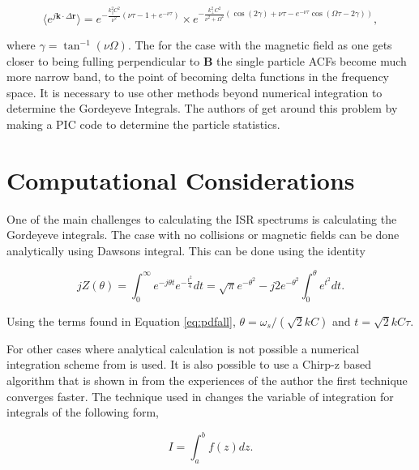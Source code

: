 \documentclass[10pt]{report}
\begin{document}
\begin{equation}
\label{eq:colspacf}
\langle e^{j\mathbf{k}\cdot\Delta \mathbf{r}}\rangle = e^{-\frac{k_\parallel^2C^2}{\nu^2}\left( \nu \tau-1+e^{-\nu\tau}\right)}\times e^{-\frac{k_\perp^2C^2}{\nu^2+\Omega^2}\left(\cos(2\gamma) + \nu \tau-e^{-\nu\tau}\cos(\Omega\tau-2\gamma)\right)},
\end{equation}
 
\noindent where $\gamma = \tan^{-1}(\nu\Omega)$. The for the case with the magnetic field as one gets closer to being fulling perpendicular to $\mathbf{B}$ the single particle ACFs become much more narrow band, to the point of becoming delta functions in the frequency space. It is necessary to use other methods beyond numerical integration to determine the Gordeyeve Integrals. The authors of \cite{kudeki:milla:2} get around this problem by making a PIC code to determine the particle statistics. 


 \section*{Computational Considerations}
One of the main challenges to calculating the ISR spectrums is calculating the Gordeyeve integrals. The case with no collisions or magnetic fields can be done analytically using Dawsons integral. This can be done using the identity

\begin{equation}
\label{eq:daw1}
jZ(\theta) = \int_0^{\infty} e^{-j\theta t}e^{-\frac{t^2}{4}}dt = \sqrt{\pi}e^{-\theta^2}-j2e^{-\theta^2}\int_0^\theta e^{t^2}dt.
\end{equation}

\noindent Using the terms found in Equation \ref{eq:pdfall}, $\theta=\omega_s/\left(\sqrt{2}kC\right)$ and $t=\sqrt{2}kC\tau$.

For other cases where analytical calculation is not possible a numerical integration scheme from \cite{Ooi:2007jx} is used. It is also possible to use a Chirp-z based algorithm that is shown in \cite{Li:1991gr} from the experiences of the author the first technique converges faster. The technique used in \cite{Ooi:2007jx} changes the variable of integration for integrals of the following form,

\begin{equation}
\label{eq:Sommer}
I=\int_a^b f(z) dz.
\end{equation}
\end{document}

